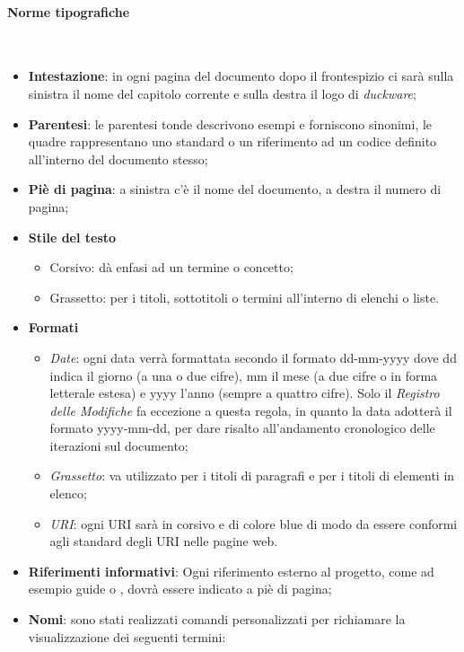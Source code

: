 \paragraph{Norme tipografiche}\mbox{}\\[0.4cm]
\begin{itemize}
    \item \textbf{Intestazione}: in ogni pagina del documento dopo il frontespizio ci sarà sulla sinistra il nome del capitolo corrente e sulla destra il logo di \emph{duckware};
    \item \textbf{Parentesi}: le parentesi tonde descrivono esempi e forniscono sinonimi, le quadre rappresentano uno standard  o un riferimento ad un codice definito all’interno del documento stesso;
    \item \textbf{Piè di pagina}: a sinistra c’è il nome del documento, a destra il numero di pagina;
    \item \textbf{Stile del testo}
    \begin{itemize}
        \item Corsivo: dà enfasi ad un termine o concetto;
        \item Grassetto: per i titoli, sottotitoli o termini all’interno di elenchi o liste.
    \end{itemize}
    \item \textbf{Formati}
    \begin{itemize}
        \item \emph{Date}: ogni data verrà formattata secondo il formato dd-mm-yyyy dove dd indica il giorno (a una o due cifre), mm il mese (a due cifre o in forma letterale estesa) e yyyy l’anno (sempre a quattro cifre). Solo il \emph{Registro delle Modifiche} fa eccezione a questa regola, in quanto la data   adotterà il formato yyyy-mm-dd, per dare risalto all'andamento cronologico delle iterazioni sul documento;
        \item \emph{Grassetto}: va utilizzato per i titoli di paragrafi e per i titoli di elementi in elenco;
        \item \emph{URI}: ogni URI sarà in corsivo e di colore blue di modo da essere conformi agli standard degli URI nelle pagine web.
    \end{itemize}
    \item \textbf{Riferimenti informativi}: Ogni riferimento esterno al progetto, come ad esempio guide o , dovrà essere indicato a piè di pagina;
    \item \textbf{Nomi}: sono stati realizzati comandi personalizzati per richiamare la visualizzazione dei seguenti termini:

\end{itemize}
